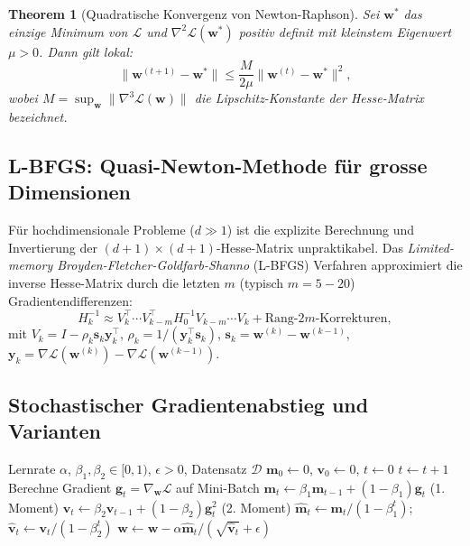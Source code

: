 ﻿\documentclass[12pt, a4paper]{article}
\newtheorem{theorem}{Theorem}[section]
\theoremstyle{definition}
\theoremstyle{remark}
\newcommand{\vw}{\bm{w}}
\newcommand{\T}{\top}
\begin{document}
\begin{theorem}[Quadratische Konvergenz von Newton-Raphson]
  Sei $\vw^*$ das einzige Minimum von $\mathcal{L}$ und $\nabla^2\mathcal{L}(\vw^*)$ positiv definit
  mit kleinstem Eigenwert $\mu > 0$. Dann gilt lokal:
  \begin{equation}
    \|\vw^{(t+1)} - \vw^*\| \leq \frac{M}{2\mu} \|\vw^{(t)} - \vw^*\|^2,
    \label{eq:newton_convergence}
  \end{equation}
  wobei $M = \sup_{\vw} \|\nabla^3\mathcal{L}(\vw)\|$ die Lipschitz-Konstante der Hesse-Matrix bezeichnet.
\end{theorem}

\subsection{L-BFGS: Quasi-Newton-Methode für grosse Dimensionen}

Für hochdimensionale Probleme ($d \gg 1$) ist die explizite Berechnung und Invertierung der
$(d+1)\times(d+1)$-Hesse-Matrix unpraktikabel. Das \emph{Limited-memory Broyden-Fletcher-Goldfarb-Shanno}
(L-BFGS) Verfahren approximiert die inverse Hesse-Matrix durch die letzten $m$ (typisch $m=5-20$)
Gradientendifferenzen:
\begin{equation}
  H_k^{-1} \approx V_k^\T \cdots V_{k-m}^\T H_0^{-1} V_{k-m} \cdots V_k + \text{Rang-}2m\text{-Korrekturen},
\end{equation}
mit $V_k = I - \rho_k \bm{s}_k\bm{y}_k^\T$, $\rho_k = 1/(\bm{y}_k^\T\bm{s}_k)$,
$\bm{s}_k = \vw^{(k)}-\vw^{(k-1)}$, $\bm{y}_k = \nabla\mathcal{L}(\vw^{(k)})-\nabla\mathcal{L}(\vw^{(k-1)})$.

\subsection{Stochastischer Gradientenabstieg und Varianten}

\begin{algorithm}[H]
  \caption{Adam-Optimizer für logistische Regression}
  \label{alg:adam}
  \begin{algorithmic}[1]
    \Require Lernrate $\alpha$, $\beta_1, \beta_2 \in [0,1)$, $\epsilon > 0$, Datensatz $\mathcal{D}$
    \State $\bm{m}_0 \leftarrow 0$, $\bm{v}_0 \leftarrow 0$, $t \leftarrow 0$
      \State $t \leftarrow t+1$
      \State Berechne Gradient $\bm{g}_t = \nabla_{\vw}\mathcal{L}$ auf Mini-Batch
      \State $\bm{m}_t \leftarrow \beta_1 \bm{m}_{t-1} + (1-\beta_1)\bm{g}_t$ \hfill (1. Moment)
      \State $\bm{v}_t \leftarrow \beta_2 \bm{v}_{t-1} + (1-\beta_2)\bm{g}_t^2$ \hfill (2. Moment)
      \State $\hat{\bm{m}}_t \leftarrow \bm{m}_t/(1-\beta_1^t)$; $\hat{\bm{v}}_t \leftarrow \bm{v}_t/(1-\beta_2^t)$
      \State $\vw \leftarrow \vw - \alpha \hat{\bm{m}}_t/(\sqrt{\hat{\bm{v}}_t}+\epsilon)$
    \EndWhile
  \end{algorithmic}
\end{algorithm}
\end{document}
